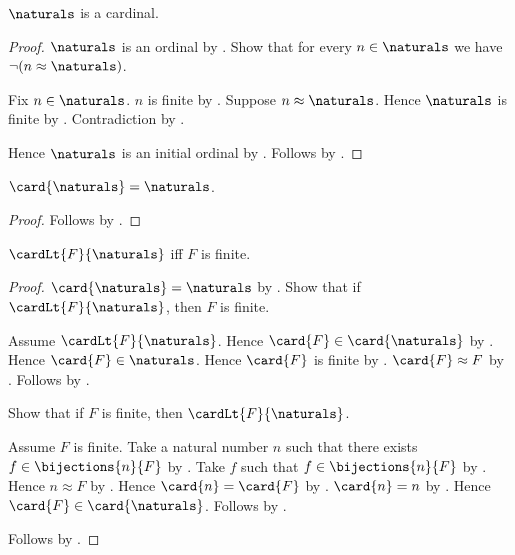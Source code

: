 \begin{theorem}\label{naturals_is_cardinal}
    $\naturals$ is a cardinal.
\end{theorem}
\begin{proof}
    $\naturals$ is an ordinal by .
    Show that for every $n\in\naturals$ we have
        $\lnot(n\approx\naturals)$.
    \begin{subproof}
        Fix $n\in\naturals$.
        $n$ is finite by .
        Suppose $n\approx\naturals$.
        Hence $\naturals$ is finite by .
        Contradiction by .
    \end{subproof}
    Hence $\naturals$ is an initial ordinal by .
    Follows by .
\end{proof}

\begin{corollary}\label{card_of_naturals}
    $\card{\naturals}=\naturals$.
\end{corollary}
\begin{proof}
    Follows by .
\end{proof}

\begin{theorem}\label{below_omega_iff_finite}
    $\cardLt{F}{\naturals}$ iff $F$ is finite.
\end{theorem}
\begin{proof}
    $\card{\naturals}=\naturals$ by .
    Show that if $\cardLt{F}{\naturals}$, then $F$ is finite.
    \begin{subproof}
        Assume $\cardLt{F}{\naturals}$.
        Hence $\card{F}\in\card{\naturals}$ by
            .
        Hence $\card{F}\in\naturals$.
        Hence $\card{F}$ is finite by
            .
        $\card{F}\approx F$ by .
        Follows by .
    \end{subproof}
    Show that if $F$ is finite, then $\cardLt{F}{\naturals}$.
    \begin{subproof}
        Assume $F$ is finite.
        Take a natural number $n$ such that there exists
            $f\in\bijections{n}{F}$ by .
        Take $f$ such that $f\in\bijections{n}{F}$ by \auto.
        Hence $n\approx F$ by .
        Hence $\card{n}=\card{F}$ by
            .
        $\card{n}=n$ by .
        Hence $\card{F}\in\card{\naturals}$.
        Follows by .
    \end{subproof}
    Follows by \auto.
\end{proof}

